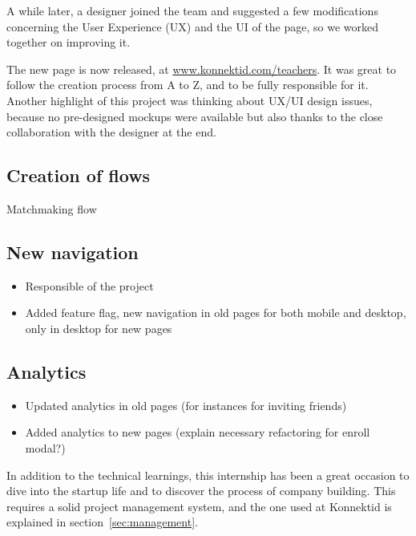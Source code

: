 A while later, a designer joined the team and suggested a few modifications concerning the User Experience (UX) and the UI of the page, so we worked together on improving it. 

The new page is now released, at \url{www.konnektid.com/teachers}. It was great to follow the creation process from A to Z, and to be fully responsible for it. Another highlight of this project was thinking about UX/UI design issues, because no pre-designed mockups were available but also thanks to the close collaboration with the designer at the end.

\subsection{Creation of flows}
\label{ssec:flows}

Matchmaking flow

\subsection{New navigation}
\label{ssec:new_nav}

\begin{itemize}
    \item Responsible of the project
    \item Added feature flag, new navigation in old pages for both mobile and desktop, only in desktop for new pages
\end{itemize}

\subsection{Analytics}
\label{ssec:analytics}

\begin{itemize}
    \item Updated analytics in old pages (for instances for inviting friends)
    \item Added analytics to new pages (explain necessary refactoring for enroll modal?)
\end{itemize}

In addition to the technical learnings, this internship has been a great occasion to dive into the startup life and to discover the process of company building. This requires a solid project management system, and the one used at Konnektid is explained in {\sc section}~\ref{sec:management}.